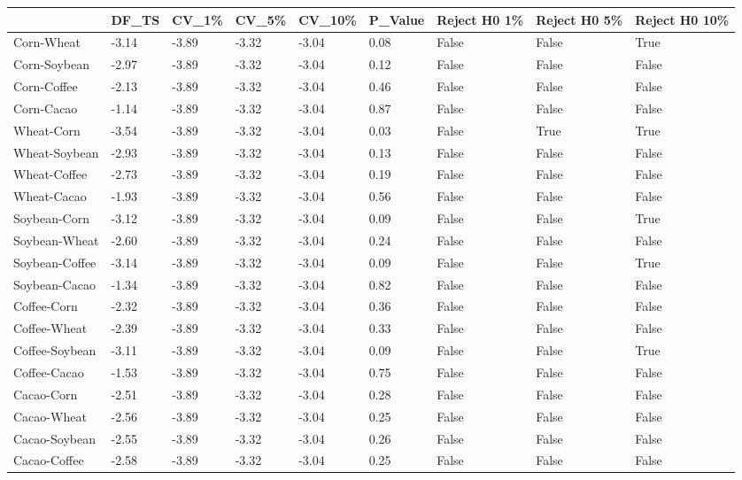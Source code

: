\begin{tabular}{lllllllll}
\toprule
{} &  DF\_TS &  CV\_1\% &  CV\_5\% & CV\_10\% & P\_Value &  Reject H0 1\% &  Reject H0 5\% &  Reject H0 10\% \\
\midrule
Corn-Wheat     &  -3.14 &  -3.89 &  -3.32 &  -3.04 &    0.08 &         False &         False &           True \\
Corn-Soybean   &  -2.97 &  -3.89 &  -3.32 &  -3.04 &    0.12 &         False &         False &          False \\
Corn-Coffee    &  -2.13 &  -3.89 &  -3.32 &  -3.04 &    0.46 &         False &         False &          False \\
Corn-Cacao     &  -1.14 &  -3.89 &  -3.32 &  -3.04 &    0.87 &         False &         False &          False \\
Wheat-Corn     &  -3.54 &  -3.89 &  -3.32 &  -3.04 &    0.03 &         False &          True &           True \\
Wheat-Soybean  &  -2.93 &  -3.89 &  -3.32 &  -3.04 &    0.13 &         False &         False &          False \\
Wheat-Coffee   &  -2.73 &  -3.89 &  -3.32 &  -3.04 &    0.19 &         False &         False &          False \\
Wheat-Cacao    &  -1.93 &  -3.89 &  -3.32 &  -3.04 &    0.56 &         False &         False &          False \\
Soybean-Corn   &  -3.12 &  -3.89 &  -3.32 &  -3.04 &    0.09 &         False &         False &           True \\
Soybean-Wheat  &  -2.60 &  -3.89 &  -3.32 &  -3.04 &    0.24 &         False &         False &          False \\
Soybean-Coffee &  -3.14 &  -3.89 &  -3.32 &  -3.04 &    0.09 &         False &         False &           True \\
Soybean-Cacao  &  -1.34 &  -3.89 &  -3.32 &  -3.04 &    0.82 &         False &         False &          False \\
Coffee-Corn    &  -2.32 &  -3.89 &  -3.32 &  -3.04 &    0.36 &         False &         False &          False \\
Coffee-Wheat   &  -2.39 &  -3.89 &  -3.32 &  -3.04 &    0.33 &         False &         False &          False \\
Coffee-Soybean &  -3.11 &  -3.89 &  -3.32 &  -3.04 &    0.09 &         False &         False &           True \\
Coffee-Cacao   &  -1.53 &  -3.89 &  -3.32 &  -3.04 &    0.75 &         False &         False &          False \\
Cacao-Corn     &  -2.51 &  -3.89 &  -3.32 &  -3.04 &    0.28 &         False &         False &          False \\
Cacao-Wheat    &  -2.56 &  -3.89 &  -3.32 &  -3.04 &    0.25 &         False &         False &          False \\
Cacao-Soybean  &  -2.55 &  -3.89 &  -3.32 &  -3.04 &    0.26 &         False &         False &          False \\
Cacao-Coffee   &  -2.58 &  -3.89 &  -3.32 &  -3.04 &    0.25 &         False &         False &          False \\
\bottomrule
\end{tabular}
